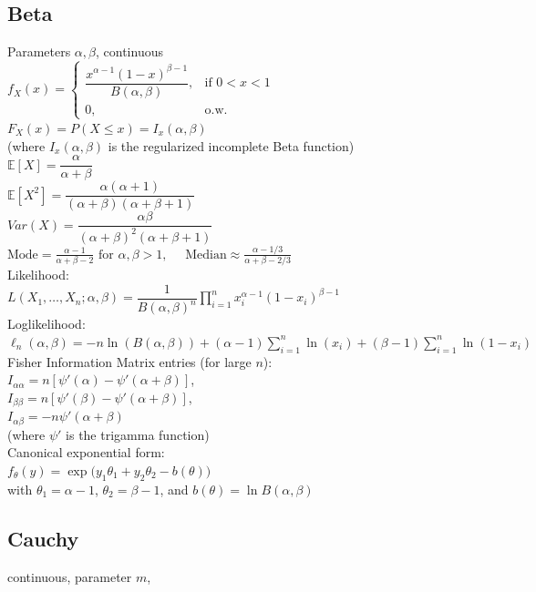\subsection*{Beta}
Parameters $\alpha, \beta$, continuous\\
$ f_X(x)=
	\begin{cases}
		\dfrac{x^{\alpha-1}(1-x)^{\beta-1}}{B(\alpha,\beta)}, & \text{if } 0 < x < 1 \\
		0, & \text{o.w.}
	\end{cases}
$\\[6pt]
$F_X(x)= P(X \le x)= I_x(\alpha,\beta)$\\
(where $I_x(\alpha,\beta)$ is the regularized incomplete Beta function)\\[6pt]
$\mathbb{E}[X]=\dfrac{\alpha}{\alpha+\beta}$\\
$\mathbb{E}[X^2]=\dfrac{\alpha(\alpha+1)}{(\alpha+\beta)(\alpha+\beta+1)}$\\
$Var(X)=\dfrac{\alpha\beta}{(\alpha+\beta)^2(\alpha+\beta+1)}$\\
$\text{Mode} = \frac{\alpha - 1}{\alpha + \beta - 2} \text{ for } \alpha,\beta > 1,\quad$ 
$\text{Median} \approx \frac{\alpha - 1/3}{\alpha + \beta - 2/3}$\\
Likelihood:\\
$L(X_1,\dots,X_n;\alpha,\beta)=
	\dfrac{1}{B(\alpha,\beta)^n}
	\prod_{i=1}^n x_i^{\alpha-1}(1-x_i)^{\beta-1}$\\[6pt]
Loglikelihood:\\
$\ell_n(\alpha,\beta)=
	-n\ln(B(\alpha,\beta))
	+ (\alpha-1)\sum_{i=1}^n \ln(x_i)
	+ (\beta-1)\sum_{i=1}^n \ln(1-x_i)$\\[6pt]
Fisher Information Matrix entries (for large $n$):\\
$I_{\alpha\alpha} = n[\psi'(\alpha) - \psi'(\alpha+\beta)]$,\\
$I_{\beta\beta} = n[\psi'(\beta) - \psi'(\alpha+\beta)]$,\\
$I_{\alpha\beta} = -n\psi'(\alpha+\beta)$\\
(where $\psi'$ is the trigamma function)\\[6pt]
Canonical exponential form:\\
$f_{\theta}(y) =
\exp\big(
	y_1\theta_1 + y_2\theta_2 - b(\theta)
\big)$\\
with $\theta_1=\alpha-1$, $\theta_2=\beta-1$, and
$b(\theta)=\ln B(\alpha,\beta)$\\


\subsection*{Cauchy}
continuous, parameter $m$,

